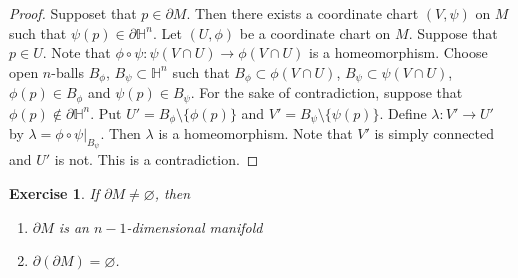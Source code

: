 \documentclass[12pt]{amsart}
\newtheorem{ex}[thm]{Exercise}
\newcommand{\lam}{\lambda}
\renewcommand{\H}{\mathbb{H}}
\begin{document}
	\begin{proof}
		Supposet that $p \in \partial M$. Then there exists a coordinate chart $(V, \psi)$ on $M$ such that $\psi(p) \in \partial \H^n$. Let $(U, \phi)$ be a coordinate chart on $M$. Suppose that $p \in U$. Note that $\phi \circ \psi : \psi(V \cap U) \rightarrow \phi(V \cap U)$ is a homeomorphism. Choose open $n$-balls $B_{\phi}$, $B_{\psi} \subset \H^n$ such that $B_{\phi} \subset \phi(V \cap U)$, $B_{\psi} \subset \psi(V \cap U)$, $\phi(p) \in B_{\phi}$ and $\psi(p) \in B_{\psi}$. For the sake of contradiction, suppose that $\phi(p) \not \in \partial \H^n$. Put $ U' = B_{\phi} \setminus \{\phi(p)\}$ and $V' = B_{\psi} \setminus \{\psi(p)\}$. Define $\lam: V' \rightarrow U'$ by $\lam = \phi \circ \psi|_{B_{\psi}}$. Then $\lam$ is a homeomorphism. Note that $V'$ is simply connected and $U'$ is not. This is a contradiction. 
	\end{proof}

	\begin{ex}
		If $\partial M \neq \varnothing$, then 
		\begin{enumerate}
			\item $\partial M$ is an $n-1$-dimensional manifold \item $\partial (\partial M) = \varnothing$.
		\end{enumerate}
	\end{ex}
\end{document}
